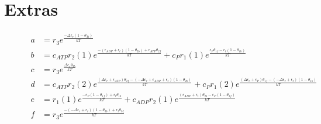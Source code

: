 \documentclass[11pt]{article}
\begin{document}
\newpage
\section{Extras}
\begin{figure}[H]
	\begin{align}
		a & = r_3 e^{\frac{ - \Delta\epsilon_{r} \left( 1 - \theta_{3b} \right)}{kT}}                                                                                                                                                                                                                                                                                                                  \\
		b & = c_{ATP} r_{2}(1) e^{\frac{ - \left( {\epsilon}_{ADP} + \epsilon_{t} \right) \left( 1 - \theta_{2b} \right) + {\epsilon}_{ATP} \theta_{2f}}{kT}} + c_P r_{1}(1) e^{\frac{{\epsilon}_P \theta_{1f} - \epsilon_{t} \left( 1 - \theta_{1b} \right)}{kT}}                                                                                                                                     \\
		c & = r_3 e^{\frac{\Delta\epsilon_{r} \theta_{3b}}{kT}}                                                                                                                                                                                                                                                                                                                                        \\
		d & = c_{ATP} r_{2}(2) e^{\frac{\left( \Delta\epsilon_{r} + {\epsilon}_{ATP} \right) \theta_{2f} - \left(  - \Delta\epsilon_{r} + {\epsilon}_{ADP} + \epsilon_{t} \right) \left( 1 - \theta_{2b} \right)}{kT}} + c_P r_{1}(2) e^{\frac{\left( \Delta\epsilon_{r} + {\epsilon}_P \right) \theta_{1f} - \left(  - \Delta\epsilon_{r} + \epsilon_{t} \right) \left( 1 - \theta_{1b} \right)}{kT}} \\
		e & = r_{1}(1) e^{\frac{ - {\epsilon}_P \left( 1 - \theta_{1f} \right) + \epsilon_{t} \theta_{1b}}{kT}} + c_{ADP} r_{2}(1) e^{\frac{\left( {\epsilon}_{ADP} + \epsilon_{t} \right) \theta_{2b} - {\epsilon}_P \left( 1 - \theta_{2f} \right)}{kT}}                                                                                                                                             \\
		f & = r_3 e^{\frac{ - \left(  - \Delta\epsilon_{r} + \epsilon_{t} \right) \left( 1 - \theta_{3b} \right) + \epsilon_{t} \theta_{3f}}{kT}}                                                                                                                                                                                                                                                      \\

\end{align}
\end{figure}
\end{document}

